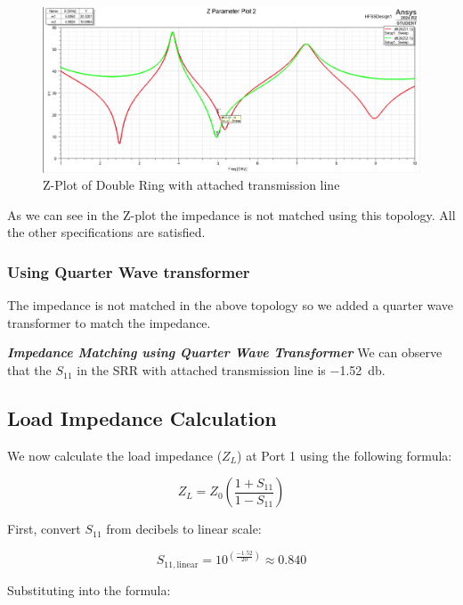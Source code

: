 \documentclass[conference]{IEEEtran}
\begin{document}
\begin{figure}
    \centering
    \includegraphics[width=1\linewidth]{Images/notmatchingzplot.png}
    \caption{Z-Plot of Double Ring with attached transmission line}
\end{figure}

As we can see in the Z-plot the impedance is not matched using this topology.
All the other specifications are satisfied.

\subsubsection{Using Quarter Wave transformer}
The impedance is not matched in the above topology so we added a quarter wave transformer to match the impedance.

\textit{\textbf{Impedance Matching using Quarter Wave Transformer}}
We can observe that the $S_{11}$ in the SRR with attached transmission line is \SI{-1.52}{\decibel}. 

\subsection*{Load Impedance Calculation}

We now calculate the load impedance ($Z_L$) at Port 1 using the following formula:

\begin{equation}
Z_L = Z_0 \left( \frac{1 + S_{11}}{1 - S_{11}} \right)
\end{equation}

First, convert $S_{11}$ from decibels to linear scale:

\begin{equation}
S_{11,\text{linear}} = 10^{\left(\frac{-1.52}{20}\right)} \approx 0.840
\end{equation}

Substituting into the formula:
\end{document}
